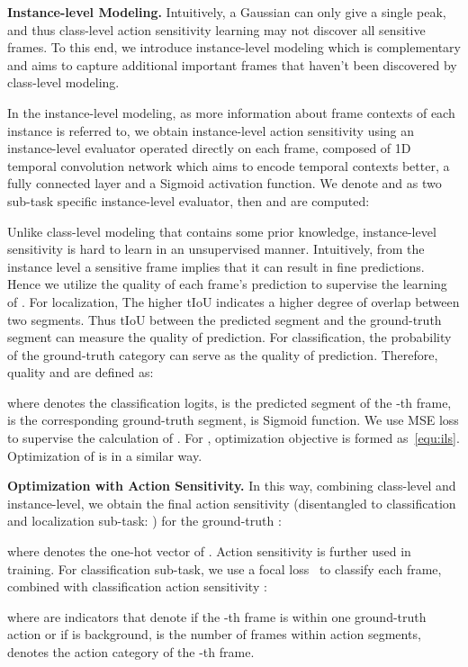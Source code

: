 \documentclass[10pt,twocolumn,letterpaper]{article}
\begin{document}
 
\textbf{Instance-level Modeling.} 
Intuitively, a Gaussian can only give a single peak, and thus class-level action sensitivity learning may not discover all sensitive frames. To this end, we introduce instance-level modeling which is complementary and aims to capture additional important frames that haven’t been discovered by class-level modeling. 

In the instance-level modeling, as more information about frame contexts of each instance is referred to, we obtain instance-level action sensitivity  using an instance-level evaluator operated directly on each frame, composed of 1D temporal convolution network which aims to encode temporal contexts better, a fully connected layer and a Sigmoid activation function. We denote  and  as two sub-task specific instance-level evaluator, then  and  are computed:  


Unlike class-level modeling that contains some prior knowledge, instance-level sensitivity  is hard to learn in an unsupervised manner. Intuitively, from the instance level a sensitive frame implies that it can result in fine predictions. Hence we utilize the quality  of each frame's prediction to supervise the learning of . 
For localization, The higher tIoU indicates a higher degree of overlap between two segments. Thus tIoU between the predicted segment and the ground-truth segment can measure the quality of prediction.
For classification, the probability of the ground-truth category can serve as the quality of prediction.
Therefore, quality   and  are defined as: 

where  denotes the classification logits,  is the predicted segment  of the -th frame,  is the corresponding ground-truth segment,  is Sigmoid function. We use MSE loss to supervise the calculation of . For , optimization objective is formed as~\ref{equ:ils}. Optimization of  is in a similar way.


\textbf{Optimization with Action Sensitivity.} In this way, combining class-level and instance-level,  we obtain the final action sensitivity  (disentangled to classification and localization sub-task: ) for the ground-truth :

where  denotes the one-hot vector of . Action sensitivity  is further used in training. For classification sub-task,  we use a focal loss~\cite{lin2017focal} to classify each frame, combined with classification action sensitivity :

where  are indicators that denote if the -th frame is within one ground-truth action or if is background,  is the number of frames within action segments,  denotes the action category of the -th frame.
\end{document}
